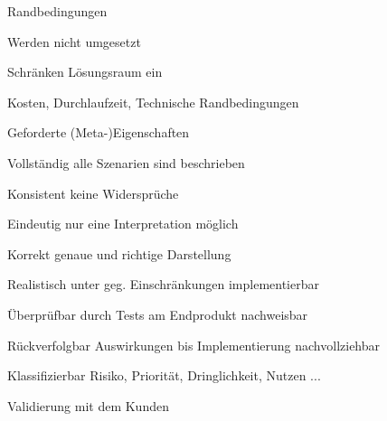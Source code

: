 \documentclass[a4paper]{article}
\begin{document}
\begin{multicols}{3}
  Randbedingungen
  \begin{itemize*}
    \item Werden nicht umgesetzt
    \item Schränken Lösungsraum ein
    \item Kosten, Durchlaufzeit, Technische Randbedingungen
  \end{itemize*}


  Geforderte (Meta-)Eigenschaften
  \begin{description*}
    \item[Vollständig] alle Szenarien sind beschrieben
    \item[Konsistent] keine Widersprüche
    \item[Eindeutig] nur eine Interpretation möglich
    \item[Korrekt] genaue und richtige Darstellung
    \item[Realistisch] unter geg. Einschränkungen implementierbar
    \item[Überprüfbar] durch Tests am Endprodukt nachweisbar
    \item[Rückverfolgbar] Auswirkungen bis Implementierung nachvollziehbar
    \item[Klassifizierbar] Risiko, Priorität, Dringlichkeit, Nutzen ...
    \item[Validierung] mit dem Kunden
  \end{description*}



\end{multicols}
\end{document}
